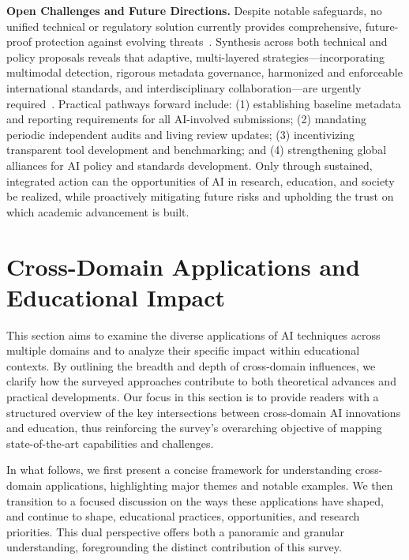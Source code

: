 \documentclass[sigconf]{acmart}
\begin{document}
\textbf{Open Challenges and Future Directions.}  
Despite notable safeguards, no unified technical or regulatory solution currently provides comprehensive, future-proof protection against evolving threats~\cite{ref14,ref24,ref85,ref92,ref95,ref97}. Synthesis across both technical and policy proposals reveals that adaptive, multi-layered strategies---incorporating multimodal detection, rigorous metadata governance, harmonized and enforceable international standards, and interdisciplinary collaboration---are urgently required~\cite{ref9,ref10,ref31,ref41,ref53,ref61,ref70,ref80,ref81,ref95,ref101,ref106,ref110}. Practical pathways forward include: (1) establishing baseline metadata and reporting requirements for all AI-involved submissions; (2) mandating periodic independent audits and living review updates; (3) incentivizing transparent tool development and benchmarking; and (4) strengthening global alliances for AI policy and standards development. Only through sustained, integrated action can the opportunities of AI in research, education, and society be realized, while proactively mitigating future risks and upholding the trust on which academic advancement is built.

\section{Cross-Domain Applications and Educational Impact}

This section aims to examine the diverse applications of AI techniques across multiple domains and to analyze their specific impact within educational contexts. By outlining the breadth and depth of cross-domain influences, we clarify how the surveyed approaches contribute to both theoretical advances and practical developments. Our focus in this section is to provide readers with a structured overview of the key intersections between cross-domain AI innovations and education, thus reinforcing the survey's overarching objective of mapping state-of-the-art capabilities and challenges.

In what follows, we first present a concise framework for understanding cross-domain applications, highlighting major themes and notable examples. We then transition to a focused discussion on the ways these applications have shaped, and continue to shape, educational practices, opportunities, and research priorities. This dual perspective offers both a panoramic and granular understanding, foregrounding the distinct contribution of this survey.
\end{document}
